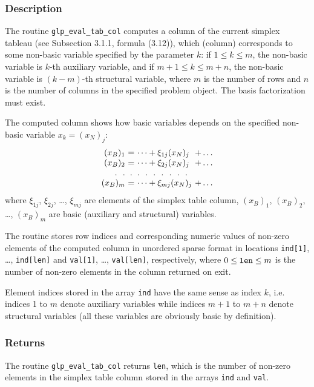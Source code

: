 \subsubsection*{Description}

The routine \verb|glp_eval_tab_col| computes a column of the current
simplex tableau (see Subsection 3.1.1, formula (3.12)), which (column)
corresponds to some non-basic variable specified by the parameter $k$:
if $1\leq k\leq m$, the non-basic variable is $k$-th auxiliary variable,
and if $m+1\leq k\leq m+n$, the non-basic variable is $(k-m)$-th
structural variable, where $m$ is the number of rows and $n$ is the
number of columns in the specified problem object. The basis
factorization must exist.

The computed column shows how basic variables depends on the specified
non-basic variable $x_k=(x_N)_j$:
$$
\begin{array}{r@{\ }c@{\ }l@{\ }l}
(x_B)_1&=&\dots+\xi_{1j}(x_N)_j&+\dots\\
(x_B)_2&=&\dots+\xi_{2j}(x_N)_j&+\dots\\
.\ \ .&.&.\ \ .\ \ .\ \ .\ \ .\ \ .\ \ .\\
(x_B)_m&=&\dots+\xi_{mj}(x_N)_j&+\dots\\
\end{array}
$$
where $\xi_{1j}$, $\xi_{2j}$, \dots, $\xi_{mj}$ are elements of the
simplex table column, $(x_B)_1$, $(x_B)_2$, \dots, $(x_B)_m$ are basic
(auxiliary and structural) variables.

The routine stores row indices and corresponding numeric values of
non-zero elements of the computed column in unordered sparse format in
locations \verb|ind[1]|, \dots, \verb|ind[len]| and \verb|val[1]|,
\dots, \verb|val[len]|, respectively, where $0\leq{\tt len}\leq m$ is
the number of non-zero elements in the column returned on exit.

Element indices stored in the array \verb|ind| have the same sense as
index $k$, i.e. indices 1 to $m$ denote auxiliary variables while
indices $m+1$ to $m+n$ denote structural variables (all these variables
are obviously basic by definition).

\subsubsection*{Returns}

The routine \verb|glp_eval_tab_col| returns \verb|len|, which is the
number of non-zero elements in the simplex table column stored in the
arrays \verb|ind| and \verb|val|.

